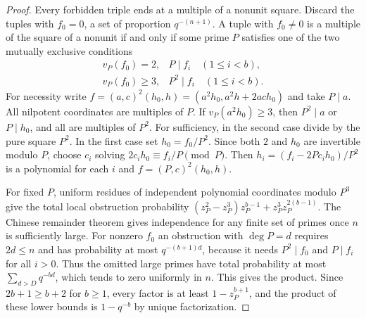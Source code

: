 \begin{proof}
Every forbidden triple ends at a multiple of a nonunit square. Discard the tuples with
$f_0=0$, a set of proportion $q^{-(n+1)}$. A tuple with $f_0\ne0$ is a multiple of the
square of a nonunit if and only if some prime $P$ satisfies one of the two mutually
exclusive conditions
\[
\begin{array}{ll}
 v_P(f_0)=2, &P\mid f_i\quad(1\le i<b),\\
 v_P(f_0)\ge3, &P^2\mid f_i\quad(1\le i<b).
\end{array}
\]
For necessity write $f=(a,c)^2(h_0,h)=(a^2h_0,a^2h+2ach_0)$ and take $P\mid a$. All
nilpotent coordinates are multiples of $P$. If $v_P(a^2h_0)\ge3$, then $P^2\mid a$ or
$P\mid h_0$, and all are multiples of $P^2$. For sufficiency, in the second case divide
by the pure square $P^2$. In the first case set $h_0=f_0/P^2$. Since both $2$ and $h_0$
are invertible modulo $P$, choose $c_i$ solving $2c_ih_0\equiv f_i/P\pmod P$. Then
$h_i=(f_i-2Pc_ih_0)/P^2$ is a polynomial for each $i$ and $f=(P,c)^2(h_0,h)$.

For fixed $P$, uniform residues of independent polynomial coordinates modulo $P^3$ give
the total local obstruction probability
$(z_P^2-z_P^3)z_P^{b-1}+z_P^3z_P^{2(b-1)}$. The Chinese remainder theorem gives
independence for any finite set of primes once $n$ is sufficiently large. For nonzero
$f_0$ an obstruction with $\deg P=d$ requires $2d\le n$ and has probability at most
$q^{-(b+1)d}$, because it needs $P^2\mid f_0$ and $P\mid f_i$ for all $i>0$. Thus the
omitted large primes have total probability at most $\sum_{d>D}q^{-bd}$, which tends to
zero uniformly in $n$. This gives the product. Since $2b+1\ge b+2$ for $b\ge1$, every
factor is at least $1-z_P^{b+1}$, and the product of these lower bounds is $1-q^{-b}$ by
unique factorization.
\end{proof}


